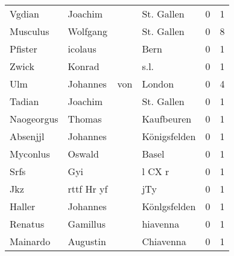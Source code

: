 \begin{center}
\begin{tiny}
\begin{longtabu}{llllrr}
                   Vgdian &                            Joachim &             &                                  St. Gallen &          0 &         1 \\
                 Musculus &                           Wolfgang &             &                                  St. Gallen &          0 &         8 \\
                  Pfister &                            icolaus &             &                                        Bern &          0 &         1 \\
                    Zwick &                             Konrad &             &                                        s.l. &          0 &         1 \\
                      Ulm &                           Johannes &         von &                                      London &          0 &         4 \\
                   Tadian &                            Joachim &             &                                  St. Gallen &          0 &         1 \\
               Naogeorgus &                             Thomas &             &                                  Kaufbeuren &          0 &         1 \\
                 Absenjjl &                           Johannes &             &                                Königsfelden &          0 &         1 \\
                 Myconlus &                             Oswald &             &                                       Basel &          0 &         1 \\
                     Srfs &                                Gyi &             &                                      l CX r &          0 &         1 \\
                      Jkz &                         rttf Hr yf &             &                                         jTy &          0 &         1 \\
                   Haller &                           Johannes &             &                                Könlgsfelden &          0 &         1 \\
                  Renatus &                           Gamillus &             &                                    hiavenna &          0 &         1 \\
                 Mainardo &                           Augustin &             &                                   Chiavenna &          0 &         1 \\

\end{longtabu}
\end{tiny}
\end{center}
